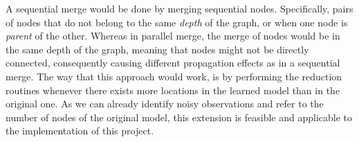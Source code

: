 %
A sequential merge would be done by merging sequential nodes. Specifically, pairs of nodes that do not belong to the same \textit{depth} of the graph, or when one node is \textit{parent} of the other. Whereas in parallel merge, the merge of nodes would be in the same depth of the graph, meaning that nodes might not be directly connected, consequently causing different propagation effects as in a sequential merge. 
%
The way that this approach would work, is by performing the reduction routines whenever there exists more locations in the learned model than in the original one. As we can already identify noisy observations and refer to the number of nodes of the original model, this extension is feasible and applicable to the implementation of this project. \\ \\ 
